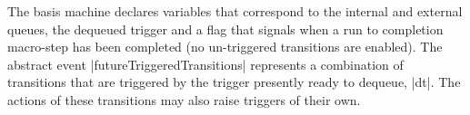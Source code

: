 The basis machine declares variables that correspond to the internal and external queues, the dequeued trigger and a flag 
that signals when a run to completion macro-step has been
completed (no un-triggered transitions are enabled).
The abstract event |futureTriggeredTransitions| represents a combination
of transitions that are triggered by the trigger presently ready to dequeue, |dt|.
The actions of these transitions may also raise triggers of their own.

